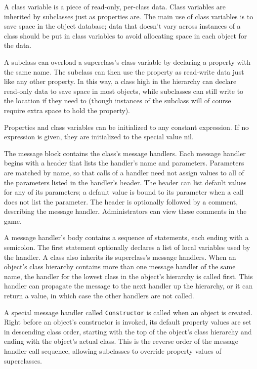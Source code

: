 A class variable is a piece of read-only, per-class data.  Class
variables are inherited by subclasses just as properties are.  The
main use of class variables is to save space in the object database;
data that doesn't vary across instances of a class should be put in
class variables to avoid allocating space in each object for the
data.

A subclass can overload a superclass's class variable by declaring a
property with the same name.  The subclass can then use the property
as read-write data just like any other property.  In this way, a class
high in the hierarchy can declare read-only data to save space in most
objects, while subclasses can still write to the location if they need
to (though instances of the subclass will of course require extra
space to hold the property).

Properties and class variables can be initialized to any constant
expression.  If no expression is given, they are initialized to the
special value nil.

The message block contains the class's message handlers.  Each message
handler begins with a header that lists the handler's name and
parameters.  Parameters are matched by name, so that calls of a
handler need not assign values to all of the parameters listed in the
handler's header.  The header can list default values for any of its
parameters; a default value is bound to its parameter when a call does
not list the parameter.  The header is optionally followed by a
comment, describing the message handler.  Administrators can view
these comments in the game.

A message handler's body contains a sequence of statements, each
ending with a semicolon.  The first statement optionally declares a
list of local variables used by the handler.  A class also inherits
its superclass's message handlers.  When an object's class hierarchy
contains more than one message handler of the same name, the handler
for the lowest class in the object's hierarchy is called first.  This
handler can propagate the message to the next handler up the
hierarchy, or it can return a value, in which case the other handlers
are not called.

A special message handler called {\tt Constructor} is called when an
object is created.  Right before an object's constructor is invoked,
its default property values are set in descending class order,
starting with the top of the object's class hierarchy and ending with
the object's actual class.  This is the reverse order of the message
handler call sequence, allowing subclasses to override property values
of superclasses.


